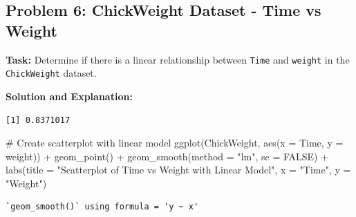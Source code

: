 \documentclass[
  letterpaper,
  DIV=11,
  numbers=noendperiod]{scrreprt}
\newenvironment{Shaded}{\begin{snugshade}}{\end{snugshade}}
\newcommand{\AttributeTok}[1]{\textcolor[rgb]{0.40,0.45,0.13}{#1}}
\newcommand{\CommentTok}[1]{\textcolor[rgb]{0.37,0.37,0.37}{#1}}
\newcommand{\ConstantTok}[1]{\textcolor[rgb]{0.56,0.35,0.01}{#1}}
\newcommand{\FunctionTok}[1]{\textcolor[rgb]{0.28,0.35,0.67}{#1}}
\newcommand{\NormalTok}[1]{\textcolor[rgb]{0.00,0.23,0.31}{#1}}
\newcommand{\OtherTok}[1]{\textcolor[rgb]{0.00,0.23,0.31}{#1}}
\newcommand{\SpecialCharTok}[1]{\textcolor[rgb]{0.37,0.37,0.37}{#1}}
\newcommand{\StringTok}[1]{\textcolor[rgb]{0.13,0.47,0.30}{#1}}
\begin{document}
\subsection*{Problem 6: ChickWeight Dataset - Time vs
Weight}\label{problem-6-chickweight-dataset---time-vs-weight-1}

\textbf{Task:} Determine if there is a linear relationship between
\texttt{Time} and \texttt{weight} in the \texttt{ChickWeight} dataset.

\textbf{Solution and Explanation:}

\begin{Shaded}
\end{Shaded}

\begin{verbatim}
[1] 0.8371017
\end{verbatim}

\begin{Shaded}
\begin{Highlighting}[]
\CommentTok{\# Create scatterplot with linear model}
\FunctionTok{ggplot}\NormalTok{(ChickWeight, }\FunctionTok{aes}\NormalTok{(}\AttributeTok{x =}\NormalTok{ Time, }\AttributeTok{y =}\NormalTok{ weight)) }\SpecialCharTok{+}
  \FunctionTok{geom\_point}\NormalTok{() }\SpecialCharTok{+}
  \FunctionTok{geom\_smooth}\NormalTok{(}\AttributeTok{method =} \StringTok{"lm"}\NormalTok{, }\AttributeTok{se =} \ConstantTok{FALSE}\NormalTok{) }\SpecialCharTok{+}
  \FunctionTok{labs}\NormalTok{(}\AttributeTok{title =} \StringTok{"Scatterplot of Time vs Weight with Linear Model"}\NormalTok{, }\AttributeTok{x =} \StringTok{"Time"}\NormalTok{, }\AttributeTok{y =} \StringTok{"Weight"}\NormalTok{)}
\end{Highlighting}
\end{Shaded}

\begin{verbatim}
`geom_smooth()` using formula = 'y ~ x'
\end{verbatim}
\end{document}
